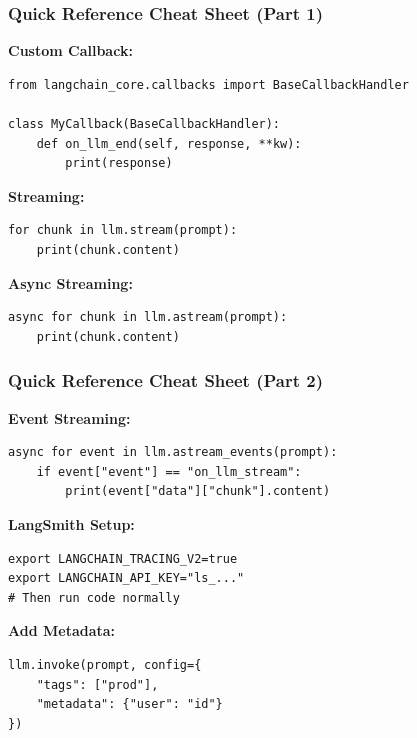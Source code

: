 \documentclass[aspectratio=169,11pt]{beamer}
\begin{document}
\begin{frame}[fragile]
  \frametitle{Quick Reference Cheat Sheet (Part 1)}

  \textbf{Custom Callback:}
  \begin{lstlisting}
from langchain_core.callbacks import BaseCallbackHandler

class MyCallback(BaseCallbackHandler):
    def on_llm_end(self, response, **kw):
        print(response)
  \end{lstlisting}

  \textbf{Streaming:}
  \begin{lstlisting}
for chunk in llm.stream(prompt):
    print(chunk.content)
  \end{lstlisting}

  \textbf{Async Streaming:}
  \begin{lstlisting}
async for chunk in llm.astream(prompt):
    print(chunk.content)
  \end{lstlisting}
\end{frame}


\begin{frame}[fragile]
  \frametitle{Quick Reference Cheat Sheet (Part 2)}

  \textbf{Event Streaming:}
  \begin{lstlisting}
async for event in llm.astream_events(prompt):
    if event["event"] == "on_llm_stream":
        print(event["data"]["chunk"].content)
  \end{lstlisting}

  \textbf{LangSmith Setup:}
  \begin{lstlisting}
export LANGCHAIN_TRACING_V2=true
export LANGCHAIN_API_KEY="ls_..."
# Then run code normally
  \end{lstlisting}

  \textbf{Add Metadata:}
  \begin{lstlisting}
llm.invoke(prompt, config={
    "tags": ["prod"],
    "metadata": {"user": "id"}
})
  \end{lstlisting}
\end{frame}

\end{document}
